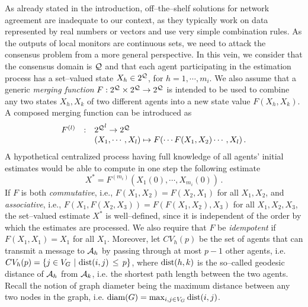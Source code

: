 \documentclass[journal, onecolumn, 12pt]{styles/IEEEtran}
\begin{document}
As already stated in the introduction, off--the--shelf solutions for network agreement are inadequate to our context, as they typically work on data represented by real numbers or vectors and use very simple combination rules. As the outputs of local monitors are continuous sets, we need to attack the consensus problem from a more general perspective. In this vein, we consider that the consensus  domain is $\mathcal{Q}$ and that each agent participating in the estimation process has a set--valued state $X_h \in 2^{\mathcal{Q}}$, for $h=1, \cdots, m_i$. We also assume that a generic {\em merging function} ${F : 2^{\mathcal{Q}} \times 2^{\mathcal{Q}} \rightarrow 2^{\mathcal{Q}}}$ is intended to be used to combine any two states $X_h, X_k$ of two different agents into a new state value $F(X_h, X_k)$. A composed merging function can be introduced as
$$
\begin{array}{rcl}
F^{(l)} & : & {2^{\mathcal{Q}}}^l \rightarrow 2^{\mathcal{Q}} \\
& & (X_1, \cdots, X_l) \mapsto F(\cdots F(X_1, X_2) \cdots, X_l)
\, .
\end{array}
$$
A hypothetical centralized process having full knowledge of all agents' initial estimates would be able to compute in one step the following estimate
\begin{equation}
\label{eq:centralized-estimation}
X^* = F^{(m_i)}(X_1(0), \cdots, X_{m_i}(0)) \, .
\end{equation}
If $F$ is both {\em commutative}, i.e., $F(X_1, X_2) = F(X_2, X_1)$ for all $X_1,X_2$, and {\em associative}, i.e., $F(X_1, F(X_2, X_3)) = F(F(X_1, X_2), X_3)$ for all $X_1,X_2,X_3$, the set--valued estimate $X^*$ is well--defined, since it is independent of the order by which the estimates are processed. 
We also require that $F$ be {\em idempotent} if $F(X_1, X_1) = X_1$ for all $X_1$. Moreover, let $CV_h(p)$ be the set of agents that can transmit a message to $\mathcal{A}_h$ by passing through at most $p-1$ other agents, i.e. $CV_h(p) = \{ j \in V_G \ | \ \mathrm{dist}(i,j) \, \leq \, p \}$, where $\mathrm{dist}(h,k)$ is the so--called geodesic distance of $\mathcal{A}_h$ from $\mathcal{A}_k$, i.e. the shortest path length between the two agents. Recall the notion of graph diameter being the maximum distance between any two nodes in the graph, i.e. $\mathrm{diam}(G)=\max_{i,j \in V_G} \mathrm{dist}(i, j)$. 
\end{document}
